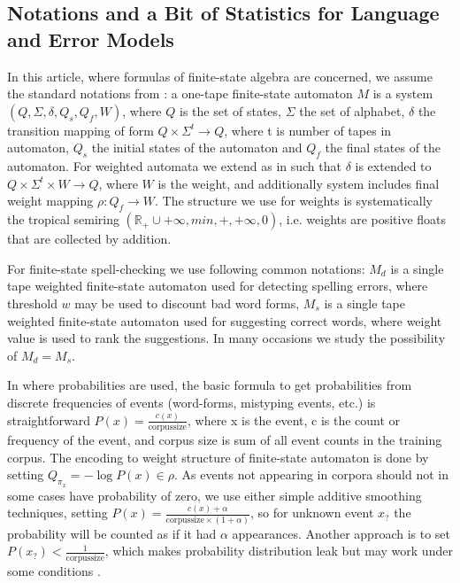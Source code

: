\documentclass[a4paper,12pt]{article}
\begin{document}
\subsection{Notations and a Bit of Statistics for Language and Error Models}
\label{subsec:theory}

In this article, where formulas of finite-state algebra are concerned, we
assume the standard notations from \cite{aho2007compilers}: a one-tape
finite-state automaton $M$ is a system $(Q, \Sigma, \delta, Q_s, Q_f, W)$,
where $Q$ is the set of states, $\Sigma$ the set of alphabet, $\delta$ the
transition mapping of form $Q \times \Sigma^t \rightarrow Q$, where t is number
of tapes in automaton, $Q_s$ the initial states of the automaton and $Q_f$ the
final states of the automaton. For weighted automata we extend as in
\cite{mohri2009weighted} such that $\delta$ is extended to $Q \times \Sigma^t
\times W \rightarrow Q$, where $W$ is the weight, and additionally system
includes final weight mapping $\rho: Q_f \rightarrow W$. The structure we
use for weights is systematically the tropical semiring 
$(\mathbb{R}_+ \cup {+\infty}, min, +, +\infty, 0)$, i.e. weights are positive
floats that are collected by addition.

For finite-state spell-checking we use following common notations: $M_d$ is a
single tape weighted finite-state automaton used for detecting spelling errors,
where threshold $w$ may be used to discount bad word forms, $M_s$ is a single
tape weighted finite-state automaton used for suggesting correct words, where
weight value is used to rank the suggestions. In many occasions we study the
possibility of $M_d = M_s$. 

In where probabilities are used, the basic formula to get probabilities from
discrete frequencies of events (word-forms, mistyping events, etc.) is
straightforward $P(x) = \frac{c(x)}{\mathrm{corpus size}}$, where x is the
event, c is the count or frequency of the event, and corpus size is sum of all
event counts in the training corpus. The encoding to weight structure of
finite-state automaton is done by setting $Q_{\pi_x} = -\log P(x) \in \rho$.
As events not appearing in corpora should not in some cases have probability
of zero, we use either simple additive smoothing techniques, setting $P(x) =
\frac{c(x) + \alpha}{\mathrm{corpus size} \times (1 + \alpha)}$, so for unknown
event $x_?$ the probability will be counted as if it had $\alpha$ appearances.
Another approach is to set $P(x_?) < \frac{1}{\mathrm{corpus size}}$, which
makes probability distribution leak but may work under some conditions 
\cite{brants2007large}.
\end{document}
